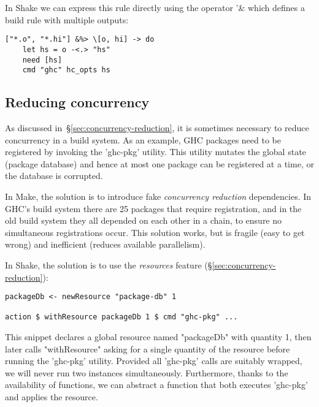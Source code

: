 In Shake we can express this rule directly using the operator \lst'&%
which defines a build rule with multiple outputs:


\begin{lstlisting}
["*.o", "*.hi"] &%> \[o, hi] -> do
    let hs = o -<.> "hs"
    need [hs]
    cmd "ghc" hc_opts hs
\end{lstlisting}

\subsection{Reducing concurrency\label{sec:ghc-pkg-db}}

As discussed in~\S\ref{sec:concurrency-reduction}, it is sometimes necessary to
reduce concurrency in a build system. As an example, GHC packages need to
be registered by invoking the \lst'ghc-pkg' utility. This utility mutates the
global state (package database) and hence at most one package can be registered
at a time, or the database is corrupted.

In Make, the solution is to introduce fake \emph{concurrency
reduction} dependencies. In GHC's build system there are 25
packages that require registration,
and in the old build system they all depended on each other in a chain, to
ensure no simultaneous registrations occur. This solution works, but is
fragile (easy to get wrong) and inefficient (reduces available parallelism).

In Shake, the solution is to use the \emph{resources} feature (\S\ref{sec:concurrency-reduction}):

\begin{lstlisting}
packageDb <- newResource "package-db" 1

action $ withResource packageDb 1 $ cmd "ghc-pkg" ...
\end{lstlisting}

This snippet declares a global resource named \lst"packageDb" with quantity 1,
then later calls \lst"withResource" asking for a single quantity of the resource before running the
\lst'ghc-pkg' utility. Provided all \lst'ghc-pkg' calls are suitably wrapped,
we will never run two instances simultaneously. Furthermore, thanks to the
availability of functions, we can abstract a function that both executes
\lst'ghc-pkg' and applies the resource.

